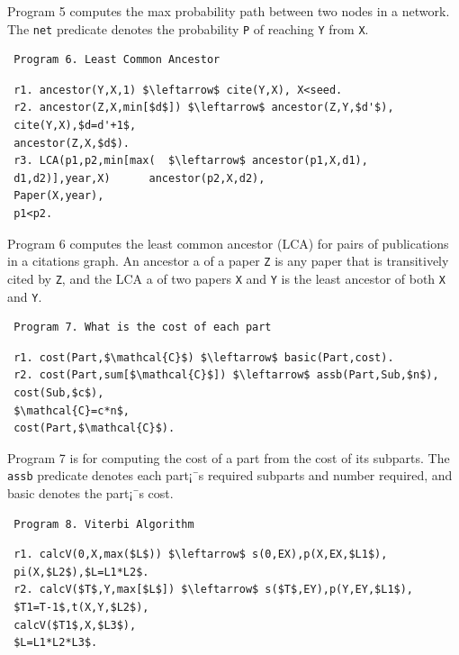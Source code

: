 \begin{appendix}
 Program 5 \cite{7113340} computes the max probability path between two nodes in a network. The \texttt{net} predicate denotes the probability \texttt{P} of reaching \texttt{Y} from \texttt{X}.
 
 \begin{verbatim}
 Program 6. Least Common Ancestor
 \end{verbatim}\small
 \begin{lstlisting}
 r1. ancestor(Y,X,1) $\leftarrow$ cite(Y,X), X<seed.
 r2. ancestor(Z,X,min[$d$]) $\leftarrow$ ancestor(Z,Y,$d'$),
 cite(Y,X),$d=d'+1$,
 ancestor(Z,X,$d$).
 r3. LCA(p1,p2,min[max(  $\leftarrow$ ancestor(p1,X,d1),
 d1,d2)],year,X)      ancestor(p2,X,d2),
 Paper(X,year),
 p1<p2.
 \end{lstlisting}
 \normalsize
 
 Program 6 \cite{Wang:2015:AFR:2824032.2824052} computes the least common ancestor (LCA) for pairs of publications in a citations graph. An ancestor a of a paper \texttt{Z} is any paper that is transitively cited by \texttt{Z}, and the LCA a of two papers \texttt{X} and \texttt{Y} is the least ancestor of both \texttt{X} and \texttt{Y}.
 
 \begin{verbatim}
 Program 7. What is the cost of each part
 \end{verbatim}\vspace{-0.1in}\small
 \begin{lstlisting}
 r1. cost(Part,$\mathcal{C}$) $\leftarrow$ basic(Part,cost).
 r2. cost(Part,sum[$\mathcal{C}$]) $\leftarrow$ assb(Part,Sub,$n$),
 cost(Sub,$c$),
 $\mathcal{C}=c*n$,
 cost(Part,$\mathcal{C}$).
 \end{lstlisting}
 \normalsize
 
 Program 7 \cite{7113340} is for computing the cost of a part from the cost of its subparts. The \texttt{assb} predicate denotes each part¡¯s required subparts and number required, and basic denotes the part¡¯s cost.
 
 \begin{verbatim}
 Program 8. Viterbi Algorithm
 \end{verbatim}\vspace{-0.1in}\small
 \begin{lstlisting}
 r1. calcV(0,X,max($L$)) $\leftarrow$ s(0,EX),p(X,EX,$L1$),
 pi(X,$L2$),$L=L1*L2$.
 r2. calcV($T$,Y,max[$L$]) $\leftarrow$ s($T$,EY),p(Y,EY,$L1$),
 $T1=T-1$,t(X,Y,$L2$),
 calcV($T1$,X,$L3$),
 $L=L1*L2*L3$.
 \end{lstlisting}
 \normalsize
 

\end{appendix}
